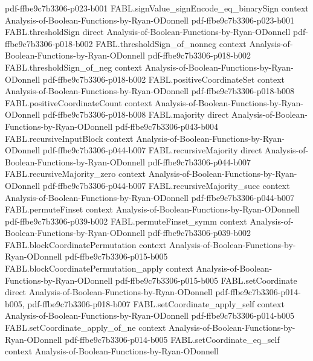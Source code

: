 \begin{theorem}
  {pdf-ffbe9c7b3306-p023-b001}
\proofstep
  {FABL.signValue_signEncode_eq_binarySign}
  {context}
  {Analysis-of-Boolean-Functions-by-Ryan-ODonnell}
  {pdf-ffbe9c7b3306-p023-b001}
\proofstep
  {FABL.thresholdSign}
  {direct}
  {Analysis-of-Boolean-Functions-by-Ryan-ODonnell}
  {pdf-ffbe9c7b3306-p018-b002}
\proofstep
  {FABL.thresholdSign_of_nonneg}
  {context}
  {Analysis-of-Boolean-Functions-by-Ryan-ODonnell}
  {pdf-ffbe9c7b3306-p018-b002}
\proofstep
  {FABL.thresholdSign_of_neg}
  {context}
  {Analysis-of-Boolean-Functions-by-Ryan-ODonnell}
  {pdf-ffbe9c7b3306-p018-b002}
\proofstep
  {FABL.positiveCoordinateSet}
  {context}
  {Analysis-of-Boolean-Functions-by-Ryan-ODonnell}
  {pdf-ffbe9c7b3306-p018-b008}
\proofstep
  {FABL.positiveCoordinateCount}
  {context}
  {Analysis-of-Boolean-Functions-by-Ryan-ODonnell}
  {pdf-ffbe9c7b3306-p018-b008}
\proofstep
  {FABL.majority}
  {direct}
  {Analysis-of-Boolean-Functions-by-Ryan-ODonnell}
  {pdf-ffbe9c7b3306-p043-b004}
\proofstep
  {FABL.recursiveInputBlock}
  {context}
  {Analysis-of-Boolean-Functions-by-Ryan-ODonnell}
  {pdf-ffbe9c7b3306-p044-b007}
\proofstep
  {FABL.recursiveMajority}
  {direct}
  {Analysis-of-Boolean-Functions-by-Ryan-ODonnell}
  {pdf-ffbe9c7b3306-p044-b007}
\proofstep
  {FABL.recursiveMajority_zero}
  {context}
  {Analysis-of-Boolean-Functions-by-Ryan-ODonnell}
  {pdf-ffbe9c7b3306-p044-b007}
\proofstep
  {FABL.recursiveMajority_succ}
  {context}
  {Analysis-of-Boolean-Functions-by-Ryan-ODonnell}
  {pdf-ffbe9c7b3306-p044-b007}
\proofstep
  {FABL.permuteFinset}
  {context}
  {Analysis-of-Boolean-Functions-by-Ryan-ODonnell}
  {pdf-ffbe9c7b3306-p039-b002}
\proofstep
  {FABL.permuteFinset_symm}
  {context}
  {Analysis-of-Boolean-Functions-by-Ryan-ODonnell}
  {pdf-ffbe9c7b3306-p039-b002}
\proofstep
  {FABL.blockCoordinatePermutation}
  {context}
  {Analysis-of-Boolean-Functions-by-Ryan-ODonnell}
  {pdf-ffbe9c7b3306-p015-b005}
\proofstep
  {FABL.blockCoordinatePermutation_apply}
  {context}
  {Analysis-of-Boolean-Functions-by-Ryan-ODonnell}
  {pdf-ffbe9c7b3306-p015-b005}
\proofstep
  {FABL.setCoordinate}
  {direct}
  {Analysis-of-Boolean-Functions-by-Ryan-ODonnell}
  {pdf-ffbe9c7b3306-p014-b005,
    pdf-ffbe9c7b3306-p018-b007}
\proofstep
  {FABL.setCoordinate_apply_self}
  {context}
  {Analysis-of-Boolean-Functions-by-Ryan-ODonnell}
  {pdf-ffbe9c7b3306-p014-b005}
\proofstep
  {FABL.setCoordinate_apply_of_ne}
  {context}
  {Analysis-of-Boolean-Functions-by-Ryan-ODonnell}
  {pdf-ffbe9c7b3306-p014-b005}
\proofstep
  {FABL.setCoordinate_eq_self}
  {context}
  {Analysis-of-Boolean-Functions-by-Ryan-ODonnell}

\end{theorem}
